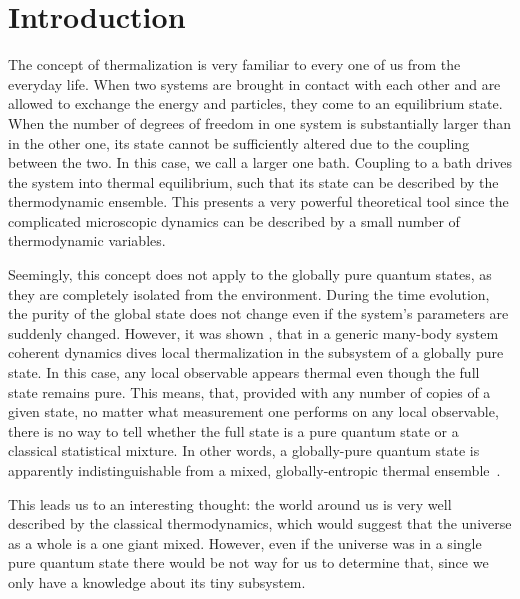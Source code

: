 \chapter{Introduction}
\label{introduction}

The concept of thermalization is very familiar to every one of us from the everyday life. When two systems are brought in contact with each other and are allowed to exchange the energy and particles, they come to an equilibrium state. When the number of degrees of freedom in one system is substantially larger than in the other one, its state cannot be sufficiently altered due to the coupling between the two. In this case, we call a larger one bath. Coupling to a bath drives the system into thermal equilibrium, such that its state can be described by the thermodynamic ensemble. This presents a very powerful theoretical tool since the complicated microscopic dynamics can be described by a small number of thermodynamic variables.

Seemingly, this concept does not apply to the globally pure quantum states, as they are completely isolated from the environment. During the time evolution, the purity of the global state does not change even if the system's parameters are suddenly changed. However, it was shown \cite{Deutsch1991, Olshanii2008,Eisert2015}, that in a generic many-body system coherent dynamics dives local thermalization in the subsystem of a globally pure state. In this case, any local observable appears thermal even though the full state remains pure. This means, that, provided with any number of copies of a given state,  no matter what measurement one performs on any local observable, there is no way to tell whether the full state is a pure quantum state or a classical statistical mixture. In other words, a globally-pure quantum state is apparently indistinguishable from a mixed, globally-entropic thermal ensemble~\cite{Shankar1985, Deutsch1991, SrendickiETH, Olshanii2008}.

This leads us to an interesting thought: the world around us is very well described by the classical thermodynamics, which would suggest that the universe as a whole is a one giant mixed. However, even if the universe was in a single pure quantum state there would be not way for us to determine that, since we only have a knowledge about its tiny subsystem.

